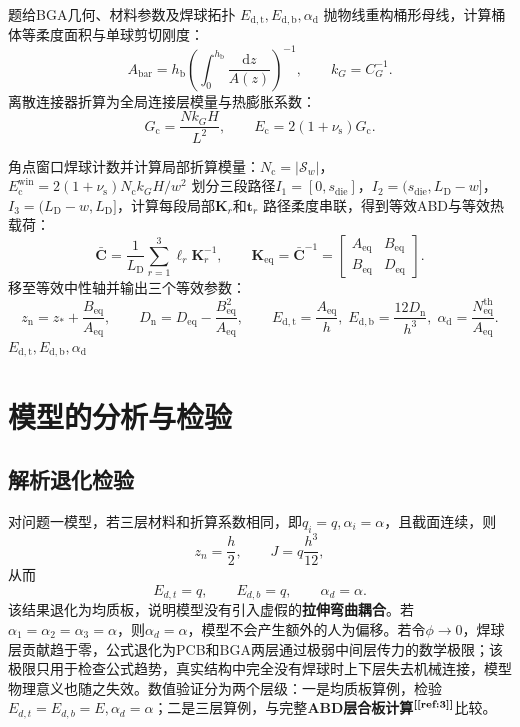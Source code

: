 \documentclass[draft,12pt,a4paper]{ctexart}
\theoremstyle{definition}
\newcommand{\diff}{\mathrm{d}}
\begin{document}
\begin{algorithm}[H]
\caption{问题三等效参数计算流程}\label{alg:q3}
\begin{algorithmic}[1]
\Require 题给BGA几何、材料参数及焊球拓扑
\Ensure $E_{\mathrm{d,t}},E_{\mathrm{d,b}},\alpha_{\mathrm d}$
\State 抛物线重构桶形母线，计算桶体等柔度面积与单球剪切刚度：
\[
A_{\mathrm{bar}}=h_{\mathrm b}\left(\int_0^{h_{\mathrm b}}\frac{\diff z}{A(z)}\right)^{-1},\qquad
k_G=C_G^{-1}.
\]
\State 离散连接器折算为全局连接层模量与热膨胀系数：
\[
G_{\mathrm c}=\frac{Nk_GH}{L^2},\qquad
E_{\mathrm c}=2(1+\nu_{\mathrm s})G_{\mathrm c}.
\]

\State 角点窗口焊球计数并计算局部折算模量：$N_{\mathrm c} = |\mathcal S_w|$，$E_{\mathrm c}^{\mathrm{win}} = 2(1+\nu_{\mathrm s})N_{\mathrm c}k_GH/w^2$
\State 划分三段路径$I_1=[0,s_{\mathrm{die}}]$，$I_2=(s_{\mathrm{die}},L_{\mathrm D}-w]$，$I_3=(L_{\mathrm D}-w,L_{\mathrm D}]$，计算每段局部$\mathbf K_r$和$\mathbf t_r$
\State 路径柔度串联，得到等效ABD与等效热载荷：
\[
\bar{\mathbf C}=\frac{1}{L_{\mathrm D}}\sum_{r=1}^{3}\ell_r\mathbf K_r^{-1},\qquad
\mathbf K_{\mathrm{eq}}=\bar{\mathbf C}^{-1}
=\begin{bmatrix}A_{\mathrm{eq}}&B_{\mathrm{eq}}\\B_{\mathrm{eq}}&D_{\mathrm{eq}}\end{bmatrix}.
\]
\State 移至等效中性轴并输出三个等效参数：
\[
z_{\mathrm n}=z_*+\frac{B_{\mathrm{eq}}}{A_{\mathrm{eq}}},\qquad
D_{\mathrm n}=D_{\mathrm{eq}}-\frac{B_{\mathrm{eq}}^2}{A_{\mathrm{eq}}},\qquad
E_{\mathrm{d,t}}=\frac{A_{\mathrm{eq}}}{h},\;
E_{\mathrm{d,b}}=\frac{12D_{\mathrm n}}{h^3},\;
\alpha_{\mathrm d}=\frac{N_{\mathrm{eq}}^{\mathrm{th}}}{A_{\mathrm{eq}}}.
\]
\State \Return $E_{\mathrm{d,t}},E_{\mathrm{d,b}},\alpha_{\mathrm d}$
\end{algorithmic}
\end{algorithm}

\section{模型的分析与检验}

\subsection{解析退化检验}

对问题一模型，若三层材料和折算系数相同，即$q_i=q,\alpha_i=\alpha$，且截面连续，则
\begin{equation}
z_n=\frac{h}{2},\qquad J=q\frac{h^3}{12},
\end{equation}
从而
\begin{equation}
E_{d,t}=q,\qquad E_{d,b}=q,\qquad \alpha_d=\alpha.
\end{equation}
该结果退化为均质板，说明模型没有引入虚假的\textbf{拉伸弯曲耦合}。若$\alpha_1=\alpha_2=\alpha_3=\alpha$，则$\alpha_d=\alpha$，模型不会产生额外的人为偏移。若令$\phi \to 0$，焊球层贡献趋于零，公式退化为PCB和BGA两层通过极弱中间层传力的数学极限；该极限只用于检查公式趋势，真实结构中完全没有焊球时上下层失去机械连接，模型物理意义也随之失效。数值验证分为两个层级：一是均质板算例，检验$E_{d,t}=E_{d,b}=E,\alpha_d=\alpha$；二是三层算例，与完整\textbf{ABD层合板计算}$^{\textbf{[\ref{ref:3}]}}$比较。
\end{document}
